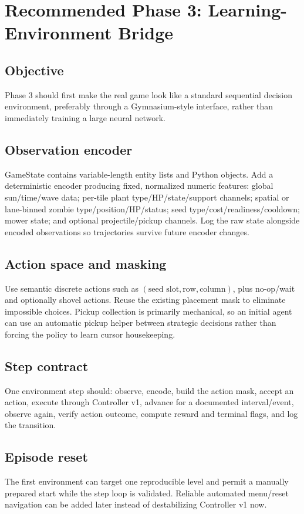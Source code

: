 \documentclass[11pt,a4paper]{article}
\begin{document}
\section{Recommended Phase 3: Learning-Environment Bridge}
\subsection{Objective}
Phase 3 should first make the real game look like a standard sequential decision environment, preferably through a Gymnasium-style interface, rather than immediately training a large neural network.
\subsection{Observation encoder}
GameState contains variable-length entity lists and Python objects. Add a deterministic encoder producing fixed, normalized numeric features: global sun/time/wave data; per-tile plant type/HP/state/support channels; spatial or lane-binned zombie type/position/HP/status; seed type/cost/readiness/cooldown; mower state; and optional projectile/pickup channels. Log the raw state alongside encoded observations so trajectories survive future encoder changes.
\subsection{Action space and masking}
Use semantic discrete actions such as \((\text{seed slot},\text{row},\text{column})\), plus no-op/wait and optionally shovel actions. Reuse the existing placement mask to eliminate impossible choices. Pickup collection is primarily mechanical, so an initial agent can use an automatic pickup helper between strategic decisions rather than forcing the policy to learn cursor housekeeping.
\subsection{Step contract}
One environment step should: observe, encode, build the action mask, accept an action, execute through Controller v1, advance for a documented interval/event, observe again, verify action outcome, compute reward and terminal flags, and log the transition.
\subsection{Episode reset}
The first environment can target one reproducible level and permit a manually prepared start while the step loop is validated. Reliable automated menu/reset navigation can be added later instead of destabilizing Controller v1 now.
\end{document}
